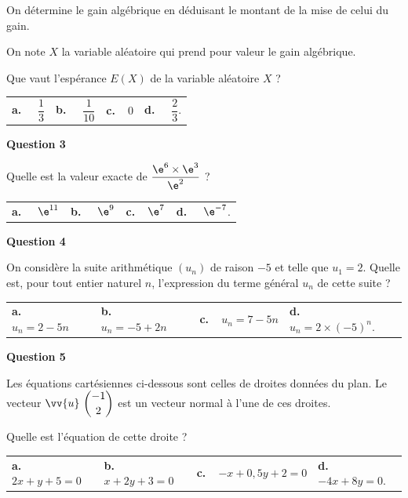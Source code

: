 On détermine le gain algébrique en déduisant le montant de la mise de celui du gain.

On note $X$ la variable aléatoire qui prend pour valeur le gain algébrique.

Que vaut l'espérance $E(X)$ de la variable aléatoire $X$ ?

\medskip

\begin{tabularx}{\linewidth}{*{4}{X}}
\textbf{a.~~} $\dfrac{1}{3} $ &\textbf{b.~~} $\dfrac{1}{10} $&\textbf{c.~~}$ 0$& \textbf{d.~~} $\dfrac{2}{3}$.
\end{tabularx}

\medskip

\textbf{Question 3}

\medskip

Quelle est la valeur exacte de $\dfrac{\e^6\times\e^3}{\e^2}$ ?

\medskip

\begin{tabularx}{\linewidth}{*{4}{X}}
\textbf{a.~~} $\e^{11}$ &\textbf{b.~~} $\e^{9}  $&\textbf{c.~~}$\e^{7} $& \textbf{d.~~} $ \e^{-7} $.
\end{tabularx}

\medskip

\textbf{Question 4}

\medskip 

On considère la suite arithmétique $\left(u_n\right)$ de raison $-5$ et telle que $u_1 = 2$. Quelle est, pour tout entier naturel $n$, l'expression du terme général $u_n$ de cette suite ?

\medskip

\begin{tabularx}{\linewidth}{*{4}{X}}
\textbf{a.~~} $u_n = 2- 5n $ &\textbf{b.~~} $u_n = -5 + 2n  $&\textbf{c.~~}$ u_n = 7 - 5n  $& \textbf{d.~~} $u_n = 2 \times(-5)^n $.
\end{tabularx}

\medskip

\textbf{Question 5}

\medskip 

Les équations cartésiennes ci-dessous sont celles de droites données du plan. Le vecteur
$\vv{u}\ \dbinom{-1}{2}$  est un vecteur normal à l'une de ces droites.

Quelle est l'équation de cette droite ?

\medskip

\begin{tabularx}{\linewidth}{*{4}{X}}
\textbf{a.~~} $2x + y+ 5 = 0 $ &\textbf{b.~~} $x + 2y + 3 = 0  $&\textbf{c.~~}$ -x + 0,5y+ 2 = 0$& \textbf{d.~~} $ -4x + 8y = 0 $.
\end{tabularx}

\vspace{0,5cm}
